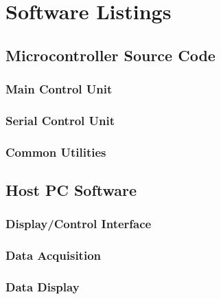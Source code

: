\chapter{Software Listings}
\lstset{numbers=left, tabsize=2, breakatwhitespace=true}
\lstset{columns=fullflexible}
\lstset{breaklines=true}
\section[Controller Source]{Microcontroller Source Code}

\subsection{Main Control Unit}
\lstset{language=c}



\subsection{Serial Control Unit}


\subsection{Common Utilities}




\section{Host PC Software}
\lstset{language=python}
\subsection{Display/Control Interface}


\subsection {Data Acquisition}


\subsection{Data Display}
\lstset{language=matlab}



